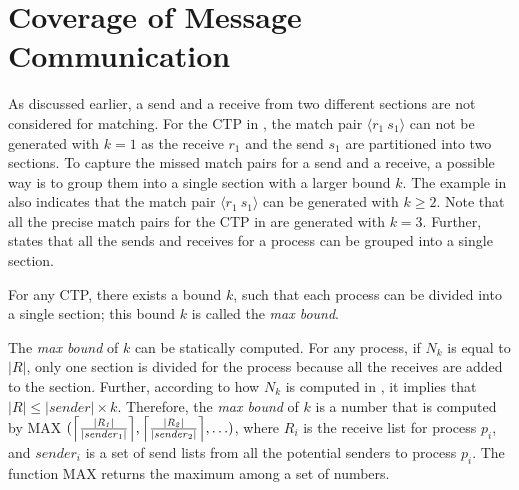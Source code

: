 \section{Coverage of Message Communication}

As discussed earlier, a send and a receive from two different sections are not considered for matching. For the CTP in , the match pair $\langle r_1\ s_1\rangle$ can not be generated with $k=1$ as the receive $r_1$ and the send $s_1$ are partitioned into two sections. 
To capture the missed match pairs for a send and a receive, a possible way is to group them into a single section with a larger bound $k$. The example in  also indicates that the match pair $\langle r_1\ s_1\rangle$ can be generated with $k\geq2$.  
Note that all the precise match pairs for the CTP in  are generated with $k=3$.
Further,  states that all the sends and receives for a process can be grouped into a single section.
 
\begin{definition}
\label{def:maxbound}
For any CTP, there exists a bound $k$, such that each process can be divided into a single section; this bound $k$ is called the \textit{max bound}. 
\end{definition} 

The \textit{max bound} of $k$ can be statically computed. 
For any process, if $N_k$ is equal to $|R|$, only one section is divided for the process because all the receives are added to the section. 
Further, according to how $N_k$ is computed in , it implies that $|R|\le |\mathit{sender}|\times k$.
Therefore, the \textit{max bound} of $k$ is a number that is computed by $\mathrm{MAX}$ $(\ceil*{\frac{\mathit{|R_{1}|}}{|\mathit{sender}_1|}},\ceil*{\frac{\mathit{|R_2|}}{|\mathit{sender}_2|}},\ldots)$, where $R_i$ is the receive list for process $p_i$, and $\textit{sender}_i$ is a set of send lists from all the potential senders to process $p_i$.
The function $\mathrm{MAX}$ returns the maximum among a set of numbers.
 
